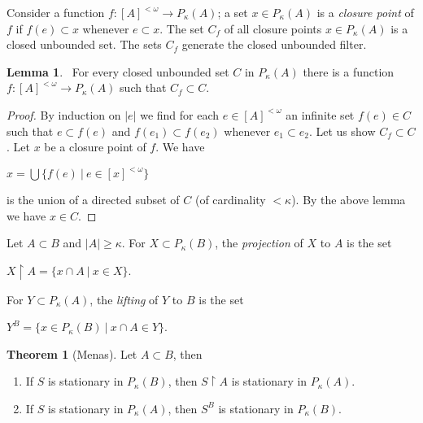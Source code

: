 \documentclass[8pt]{article}
\theoremstyle{definition}
\theoremstyle{definition}
\newtheorem{theorem}{Theorem}[section]
\theoremstyle{definition}
\theoremstyle{definition}
\theoremstyle{definition}
\theoremstyle{definition}
\theoremstyle{definition}
\theoremstyle{definition}
\newtheorem{lemma}{Lemma}[section]
\theoremstyle{definition}
\theoremstyle{definition}
\theoremstyle{definition}
\theoremstyle{definition}
\theoremstyle{definition}
\theoremstyle{definition}
\theoremstyle{question}
\begin{document}
Consider a function $f : [A]^{< \omega} \to P_{\kappa}(A)$; a set $x \in P_{\kappa}(A)$ is a 
\emph{closure point} of $f$ if $f(e) \subset x$ whenever $e \subset x$. The set $C_f$ of all closure points
$x \in P_{\kappa}(A)$ is a closed unbounded set. The sets $C_f$ generate the closed unbounded filter.

\begin{lemma}~\label{function:p:kappa}
  For every closed unbounded set $C$ in $P_{\kappa}(A)$ there
  is a function $f : [A]^{< \omega} \to P_{\kappa}(A)$ such that $C_f \subset C$.
\end{lemma}

\begin{proof}
  By induction on $|e|$ we find for each $e \in [A]^{< \omega}$ an infinite set 
  $f(e) \in C$ such that $e \subset f(e)$ and $f(e_1) \subset f(e_2)$ whenever $e_1 \subset e_2$.
  Let us show $C_f \subset C$. Let $x$ be a closure point of $f$. We have
  \begin{center}
    $x = \bigcup \{ f(e) \: | \: e \in [x]^{< \omega }\}$
  \end{center}
  is the union of a directed subset of $C$ (of cardinality $< \kappa$).
  By the above lemma we have $x \in C$.
\end{proof}

Let $A \subset B$ and $|A| \geq \kappa$. For $X \subset P_{\kappa}(B)$, the 
\emph{projection} of $X$ to $A$ is the set
\begin{center}
  $X \upharpoonright A = \{ x \cap A \: | \: x \in X\}$.
\end{center}
For $Y \subset P_{\kappa}(A)$, the \emph{lifting} of $Y$ to $B$ is the set
\begin{center}
  $Y^B = \{ x \in P_{\kappa}(B) \: | \: x \cap A \in Y \}$.
\end{center}

\begin{theorem}[Menas] Let $A \subset B$, then

  \begin{enumerate}
    \item If $S$ is stationary in $P_{\kappa}(B)$, then $S \upharpoonright A$ is stationary in $P_{\kappa}(A)$.
    \item If $S$ is stationary in $P_{\kappa}(A)$, then $S^B$ is stationary in $P_{\kappa}(B)$.
  \end{enumerate}
\end{theorem}
\end{document}
